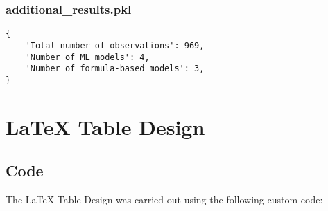 \documentclass[11pt]{article}
\begin{document}
\subsubsection*{additional\_results.pkl}

\begin{Verbatim}[tabsize=4]
{
    'Total number of observations': 969,
    'Number of ML models': 4,
    'Number of formula-based models': 3,
}
\end{Verbatim}

\section{LaTeX Table Design}
\subsection{{Code}}
The LaTeX Table Design was carried out using the following custom code:
\end{document}
